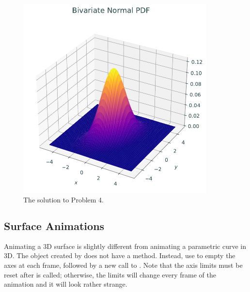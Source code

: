 \begin{figure}[H]
\centering
\includegraphics[width=100mm]{figures/normal_density.pdf}
\caption{The solution to Problem 4.}
\label{lab0:surf}
\end{figure}

\subsection*{Surface Animations}
Animating a 3D surface is slightly different from animating a parametric curve in 3D.
The object created by  does not have a  method.
Instead, use  to empty the axes at each frame, followed by a new call to .
Note that the axis limits must be reset after  is called; otherwise, the limits will change every frame of the animation and it will look rather strange.

